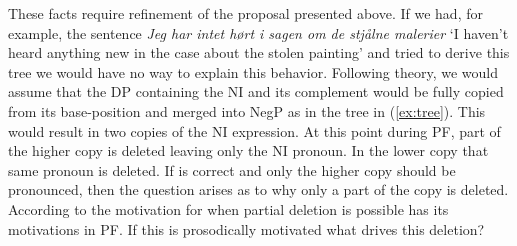 \documentclass[12pt, letterpaper]{article}
\begin{document}
These facts require refinement of the proposal presented above. If we had, for example, the sentence \emph{Jeg har intet hørt i sagen om de stjålne malerier} `I haven't heard anything new in the case about the stolen painting' and tried to derive this tree we would have no way to explain this behavior. Following \citet{zeijlstraSyntacticallyComplexStatus2011} theory, we would assume that the DP containing the NI and its complement would be fully copied from its base-position and merged into NegP as in the tree in (\ref{ex:tree}). This would result in two copies of the NI expression. 
\ea	\label{ex:tree} 
\z 
At this point during PF, part of the higher copy is deleted leaving only the NI pronoun. In the lower copy that same pronoun is deleted. 
\ea \label{ex:tree-problem}
\z 
If \citet{chomskyMinimalistProgramLinguistic1993} is correct and only the higher copy should be pronounced, then the question arises as to why only a part of the copy is deleted. According to \citet{fanselowRemarksEconomyPronunciation2001,fanselowDistributedDeletion2002} the motivation for when partial deletion is possible has its motivations in PF. If this is prosodically motivated what drives this deletion?
\end{document}
